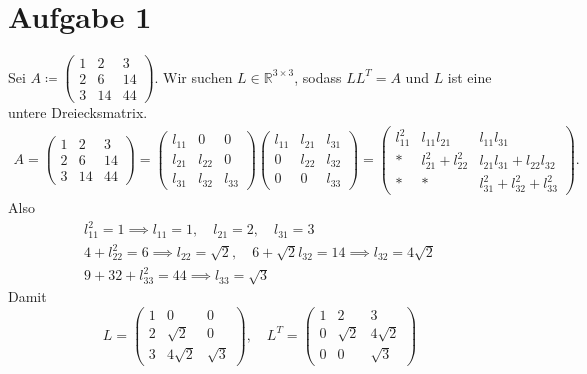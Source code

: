 \documentclass[9pt]{extarticle}
\theoremstyle{named}
\begin{document}
\section*{Aufgabe 1}
Sei $A \coloneqq \begin{pmatrix}1 &2 & 3 \\ 2 & 6 & 14 \\ 3 & 14 & 44\end{pmatrix}$. Wir suchen $L \in \mathbb R^{3 \times 3}$, sodass $LL^T = A$ und $L$ ist eine untere Dreiecksmatrix.
\begin{align*}
	A = \begin{pmatrix}1 &2 & 3 \\ 2 & 6 & 14 \\ 3 & 14 & 44\end{pmatrix} =
	\begin{pmatrix}l_{11} & 0 & 0 \\ l_{21} & l_{22} & 0 \\ l_{31} & l_{32} & l_{33} \end{pmatrix}
	\begin{pmatrix}l_{11} & l_{21} & l_{31} \\ 0 & l_{22} & l_{32} \\  0 & 0 & l_{33} \end{pmatrix}  =
	\begin{pmatrix}
		l_{11}^2 & l_{11}l_{21} & l_{11}l_{31} \\ * & l_{21}^2+l_{22}^2 & l_{21}l_{31} + l_{22} l_{32} \\ * & * & l_{31}^2+l_{32}^2 + l_{33}^2
	\end{pmatrix}.
\end{align*}
Also
\begin{gather*}
l_{11}^2 = 1 \implies l_{11} = 1, \quad l_{21} = 2, \quad l_{31} = 3 \\
4 + l_{22}^2 = 6 \implies l_{22} = \sqrt{2}, \quad 6 + \sqrt{2}l_{32} = 14 \implies l_{32} = 4\sqrt 2 \\
9 + 32 + l_{33}^2 = 44 \implies l_{33} = \sqrt 3
\end{gather*}
Damit
\[
	L = 
	\begin{pmatrix}
		1 & 0 & 0 \\
		2 & \sqrt 2 & 0 \\
		3 & 4\sqrt 2 & \sqrt 3
	\end{pmatrix}, \quad 
	L^T = \begin{pmatrix}
	1 & 2 & 3 \\
	 0 & \sqrt 2 & 4\sqrt 2 \\
	0 & 0 & \sqrt 3
	\end{pmatrix}
\]
\end{document}
